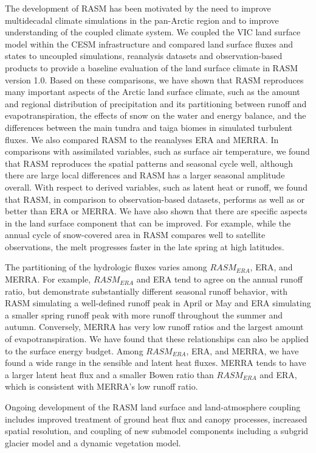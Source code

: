 The development of RASM has been motivated by the need to improve multidecadal climate simulations in the pan-Arctic region and to improve understanding of the coupled climate system.
We coupled the VIC land surface model within the CESM infrastructure and compared land surface fluxes and states to uncoupled simulations, reanalysis datasets and observation-based products to provide a baseline evaluation of the land surface climate in RASM version 1.0.
Based on these comparisons, we have shown that RASM reproduces many important aspects of the Arctic land surface climate, such as the amount and regional distribution of precipitation and its partitioning between runoff and evapotranspiration, the effects of snow on the water and energy balance, and the differences between the main tundra and taiga biomes in simulated turbulent fluxes.
We also compared RASM to the reanalyses ERA and MERRA.
In comparisons with assimilated variables, such as surface air temperature, we found that RASM reproduces the spatial patterns and seasonal cycle well, although there are large local differences and RASM has a larger seasonal amplitude overall.
With respect to derived variables, such as latent heat or runoff, we found that RASM, in comparison to observation-based datasets, performs as well as or better than ERA or MERRA.
We have also shown that there are specific aspects in the land surface component that can be improved.
For example, while the annual cycle of snow-covered area in RASM compares well to satellite observations, the melt progresses faster in the late spring at high latitudes.

The partitioning of the hydrologic fluxes varies among $RASM_{ERA}$, ERA, and MERRA.
For example, $RASM_{ERA}$ and ERA tend to agree on the annual runoff ratio, but demonstrate substantially different seasonal runoff behavior, with RASM simulating a well-defined runoff peak in April or May and ERA simulating a smaller spring runoff peak with more runoff throughout the summer and autumn.
Conversely, MERRA has very low runoff ratios and the largest amount of evapotranspiration.
We have found that these relationships can also be applied to the surface energy budget.
Among $RASM_{ERA}$, ERA, and MERRA, we have found a wide range in the sensible and latent heat fluxes.
MERRA tends to have a larger latent heat flux and a smaller Bowen ratio than $RASM_{ERA}$ and ERA, which is consistent with MERRA’s low runoff ratio.

Ongoing development of the RASM land surface and land-atmosphere coupling includes improved treatment of ground heat flux and canopy processes, increased spatial resolution, and coupling of new submodel components including a subgrid glacier model and a dynamic vegetation model.


